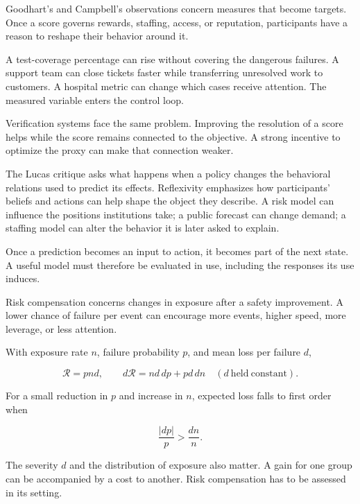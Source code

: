 Goodhart's and Campbell's observations concern measures that become targets.\cite{goodhart1975problems,campbell1979assessing} Once a score governs rewards, staffing, access, or reputation, participants have a reason to reshape their behavior around it.

A test-coverage percentage can rise without covering the dangerous failures. A support team can close tickets faster while transferring unresolved work to customers. A hospital metric can change which cases receive attention. The measured variable enters the control loop.

Verification systems face the same problem. Improving the resolution of a score helps while the score remains connected to the objective. A strong incentive to optimize the proxy can make that connection weaker.

The Lucas critique asks what happens when a policy changes the behavioral relations used to predict its effects.\cite{lucas1976econometric} Reflexivity emphasizes how participants' beliefs and actions can help shape the object they describe.\cite{soros1987alchemy} A risk model can influence the positions institutions take; a public forecast can change demand; a staffing model can alter the behavior it is later asked to explain.

Once a prediction becomes an input to action, it becomes part of the next state. A useful model must therefore be evaluated in use, including the responses its use induces.


Risk compensation concerns changes in exposure after a safety improvement.\cite{peltzman1975effects} A lower chance of failure per event can encourage more events, higher speed, more leverage, or less attention.

With exposure rate $n$, failure probability $p$, and mean loss per failure $d$,

\begin{equation}
\mathcal R=pnd,
\qquad
d\mathcal R=nd\,dp+pd\,dn
\quad(d\ \mathrm{held\ constant}).
\end{equation}

For a small reduction in $p$ and increase in $n$, expected loss falls to first order when

\begin{equation}
\frac{|dp|}{p}>\frac{dn}{n}.
\end{equation}

The severity $d$ and the distribution of exposure also matter. A gain for one group can be accompanied by a cost to another. Risk compensation has to be assessed in its setting.

